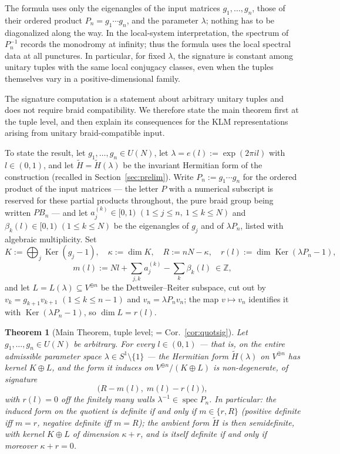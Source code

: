 \documentclass[11pt]{article}
\newtheorem{theorem}{Theorem}[section]
\theoremstyle{definition}
\newcommand{\Z}{\mathbb Z}
\newcommand{\Ht}{\widetilde H}
\newcommand{\Ker}{\operatorname{Ker}}
\newcommand{\e}[1]{e\!\left(#1\right)}   %
\newcommand{\PB}{\mathit{PB}}            %
\begin{document}
The formula uses only the eigenangles of the input matrices
$g_1,\dots,g_n$, those of their ordered product $P_n=g_1\cdots g_n$,
and the parameter $\lambda$; nothing has to be diagonalized along
the way. In the
local-system interpretation, the spectrum of $P_n^{-1}$ records the
monodromy at infinity; thus the formula uses the local spectral data
at all punctures. In particular, for fixed $\lambda$, the signature is
constant among unitary tuples with the same local conjugacy classes,
even when the tuples themselves vary in a positive-dimensional family.

The signature computation is a statement about arbitrary unitary
tuples and does not require braid compatibility. We therefore state
the main theorem first at the tuple level, and then explain its
consequences for the KLM representations arising from unitary
braid-compatible input.

To state the result, let $g_1,\dots,g_n\in U(N)$, let
$\lambda=\e{l}:=\exp(2\pi il)$ with $l\in(0,1)$, and let
$\Ht=\Ht(\lambda)$ be the
invariant Hermitian form of the construction (recalled in
Section~\ref{sec:prelim}). Write $P_n:=g_1\cdots g_n$ for the
ordered product of the input matrices --- the letter $P$ with a
numerical subscript is reserved for these partial products
throughout, the pure braid group being written $\PB_n$ --- and let
$a_j^{(k)}\in[0,1)$ $(1\le j\le n,\ 1\le k\le N)$ and
$\beta_k(l)\in[0,1)$ $(1\le k\le N)$ be the eigenangles of $g_j$ and
of $\lambda P_n$, listed with algebraic multiplicity. Set
\[
K:=\bigoplus_j\Ker(g_j-1),\quad \kappa:=\dim K,\quad R:=nN-\kappa,\quad
r(l):=\dim\Ker(\lambda P_n-1),
\]
\[
m(l):=Nl+\sum_{j,k}a_j^{(k)}-\sum_k\beta_k(l)\ \in\Z ,
\]
and let $L=L(\lambda)\subseteq V^{\oplus n}$ be the
Dettweiler--Reiter subspace, cut out by $v_k=g_{k+1}v_{k+1}$
$(1\le k\le n-1)$ and $v_n=\lambda P_nv_n$; the map $v\mapsto v_n$
identifies it with $\Ker(\lambda P_n-1)$, so $\dim L=r(l)$.

\begin{theorem}[Main Theorem, tuple level; = Cor.~\ref{cor:quotsig}]
\label{thm:main-intro}
Let $g_1,\dots,g_n\in U(N)$ be arbitrary. For every $l\in(0,1)$ ---
that is, on the entire admissible parameter space
$\lambda\in S^{1}\setminus\{1\}$ --- the Hermitian form $\Ht(\lambda)$
on $V^{\oplus n}$ has kernel $K\oplus L$, and the form it induces
on $V^{\oplus n}/(K\oplus L)$ is non-degenerate, of signature
\[
\bigl(R-m(l),\;m(l)-r(l)\bigr),
\]
with $r(l)=0$ off the finitely many walls
$\lambda^{-1}\in\operatorname{spec}P_n$. In particular: the induced
form on the quotient is definite if and only if $m\in\{r,R\}$
(positive definite iff $m=r$, negative definite iff $m=R$); the
ambient form $\Ht$ is then semidefinite, with kernel $K\oplus L$ of
dimension $\kappa+r$, and is itself definite if and only if moreover
$\kappa+r=0$.
\end{theorem}
\end{document}
